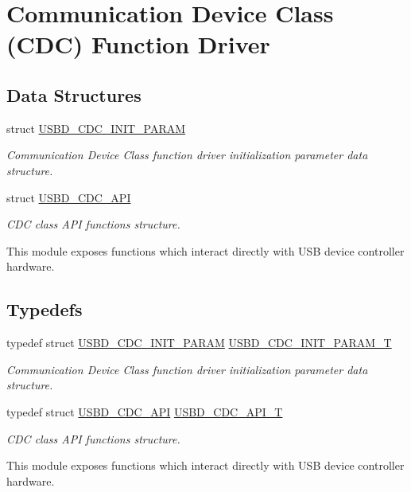 \hypertarget{group__USBD__CDC}{\section{Communication Device Class (C\-D\-C) Function Driver}
\label{group__USBD__CDC}
}
\subsection*{Data Structures}
\begin{DoxyCompactItemize}
\item 
struct \hyperlink{structUSBD__CDC__INIT__PARAM}{U\-S\-B\-D\-\_\-\-C\-D\-C\-\_\-\-I\-N\-I\-T\-\_\-\-P\-A\-R\-A\-M}
\begin{DoxyCompactList}\small\item\em Communication Device Class function driver initialization parameter data structure. \end{DoxyCompactList}\item 
struct \hyperlink{structUSBD__CDC__API}{U\-S\-B\-D\-\_\-\-C\-D\-C\-\_\-\-A\-P\-I}
\begin{DoxyCompactList}\small\item\em C\-D\-C class A\-P\-I functions structure.

This module exposes functions which interact directly with U\-S\-B device controller hardware. \end{DoxyCompactList}\end{DoxyCompactItemize}
\subsection*{Typedefs}
\begin{DoxyCompactItemize}
\item 
typedef struct \hyperlink{structUSBD__CDC__INIT__PARAM}{U\-S\-B\-D\-\_\-\-C\-D\-C\-\_\-\-I\-N\-I\-T\-\_\-\-P\-A\-R\-A\-M} \hyperlink{group__USBD__CDC_ga78b2c5f20653181161c59062795233b3}{U\-S\-B\-D\-\_\-\-C\-D\-C\-\_\-\-I\-N\-I\-T\-\_\-\-P\-A\-R\-A\-M\-\_\-\-T}
\begin{DoxyCompactList}\small\item\em Communication Device Class function driver initialization parameter data structure. \end{DoxyCompactList}\item 
typedef struct \hyperlink{structUSBD__CDC__API}{U\-S\-B\-D\-\_\-\-C\-D\-C\-\_\-\-A\-P\-I} \hyperlink{group__USBD__CDC_gaad7f61aed01ad4130bee0f50b17eb716}{U\-S\-B\-D\-\_\-\-C\-D\-C\-\_\-\-A\-P\-I\-\_\-\-T}
\begin{DoxyCompactList}\small\item\em C\-D\-C class A\-P\-I functions structure.

This module exposes functions which interact directly with U\-S\-B device controller hardware. \end{DoxyCompactList}\end{DoxyCompactItemize}


